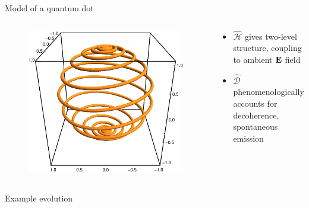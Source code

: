 \documentclass[aspectratio=169, usenames, dvipsnames]{beamer}
\begin{document}
\begin{frame}{Model of a quantum dot}
  \begin{columns}
    \begin{column}{0.25\textwidth}
      \vspace{-0.cm}
      \begin{figure}
        \includegraphics[width=\textwidth]{figures/trajectory.png}
      \end{figure}
    \end{column}
    \begin{column}{0.75\textwidth}
      \begin{itemize}
        \item $\hat{\mathcal{H}}$ gives two-level structure, coupling to ambient $\vb{E}$ field
        \item $\hat{\mathcal{D}}$ phenomenologically accounts for decoherence, spontaneous emission
      \end{itemize}
    \end{column}
  \end{columns}
\end{frame}

\begin{frame}[c, fragile]{Example evolution}
  \begin{figure}
    \centering
    
  \end{figure}
\end{frame}
\end{document}
